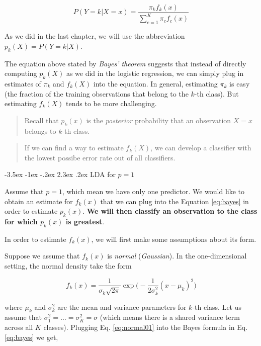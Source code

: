 \documentclass[]{book}
\makeatletter
\renewcommand\section{\@startsection {section}{1}{\z@}%
                                   {-3.5ex \@plus -1ex \@minus -.2ex}%
                                   {2.3ex \@plus.2ex}%
                                   {\normalfont\Large\bfseries\color{ForestGreen}}}
\theoremstyle{definition}
\theoremstyle{definition}
\theoremstyle{definition}
\theoremstyle{remark}
\makeatother
\begin{document}
\begin{equation}
P(Y=k|X=x) = \frac{ \pi_k f_k(x)}{\sum_{c=1}^K \pi_c f_c(x)}
\label{eq:bayes}
\end{equation}

As we did in the last chapter, we will use the abbreviation
\(p_k(X) =P(Y = k|X)\).

The equation above stated by \emph{Bayes' theorem} suggests that instead
of directly computing \(p_k(X)\) as we did in the logistic regression,
we can simply plug in estimates of \(\pi_k\) and \(f_k(X)\) into the
equation. In general, estimating \(\pi_k\) is easy (the fraction of the
training observations that belong to the \(k\)-th class). But estimating
\(f_k(X)\) tends to be more challenging.

\begin{quote}
Recall that \(p_k(x)\) is the \emph{posterior} probability that an
observation \(X=x\) belongs to \(k\)-th class.
\end{quote}

\begin{quote}
If we can find a way to estimate \(f_k(X)\), we can develop a classifier
with the lowest possibe error rate out of all classifiers.
\end{quote}

\section{\texorpdfstring{LDA for
\(p=1\)}{LDA for p=1}}\label{lda-for-p1}

Assume that \(p=1\), which mean we have only one predictor. We would
like to obtain an estimate for \(f_k(x)\) that we can plug into the
Equation \eqref{eq:bayes} in order to estimate \(p_k(x)\). \textbf{We will
then classify an observation to the class for which \(p_k(x)\) is
greatest}.

In order to estimate \(f_k(x)\), we will first make some assumptions
about its form.

Suppose we assume that \(f_k(x)\) is \emph{normal} (\emph{Gaussian}). In
the one-dimensional setting, the normal density take the form

\begin{equation}
f_k(x)= \frac{1}{\sigma_k\sqrt{2\pi}} \exp \big( - \frac{1}{2\sigma_k^2 } (x-\mu_k)^2\big)
\label{eq:normal01}
\end{equation}

where \(\mu_k\) and \(\sigma_k^2\) are the mean and variance parameters
for \(k\)-th class. Let us assume that
\(\sigma_1^2 = \ldots = \sigma_K^2 = \sigma\) (which means there is a
shared variance term across all \(K\) classes). Plugging Eq.
\eqref{eq:normal01} into the Bayes formula in Eq. \eqref{eq:bayes} we get,
\end{document}
